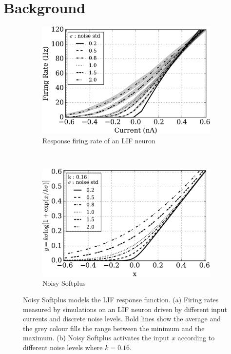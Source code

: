 \documentclass{article}
\begin{document}
	\section{Background}
	\label{sec:back}
	\begin{figure}[thb!]
		\centering
		\begin{subfigure}[t]{0.4\textwidth}
			\includegraphics[width=\textwidth]{pics_iconip/siegert.png}
			\caption{Response firing rate of an LIF neuron}
		\end{subfigure}~~~~~~
		\begin{subfigure}[t]{0.4\textwidth}
			\includegraphics[width=\textwidth]{pics_iconip/4.pdf}
			\caption{Noisy Softplus}
		\end{subfigure}
		\caption{
			Noisy Softplus models the LIF response function.
			(a) Firing rates measured by simulations on an LIF neuron driven by different input currents and discrete noise levels.
			Bold lines show the average and the grey colour fills the range between the minimum and the maximum.
			(b) Noisy Softplus activates the input $x$ according to different noise levels where $k=0.16$.}
		\label{fig:ns}
	\end{figure}
\end{document}
